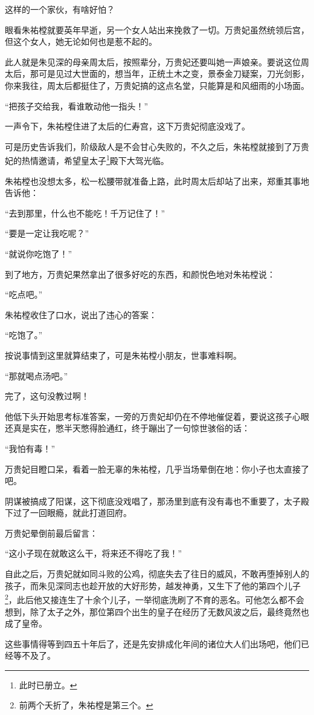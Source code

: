 \begin{multicols}{\theparacolNo}
这样的一个家伙，有啥好怕？

眼看朱祐樘就要英年早逝，另一个女人站出来挽救了一切。万贵妃虽然统领后宫，但这个女人，她无论如何也是惹不起的。

此人就是朱见深的母亲周太后，按照辈分，万贵妃还要叫她一声娘亲。要说这位周太后，那可是见过大世面的，想当年，正统土木之变，景泰金刀疑案，刀光剑影，你来我往，周太后都挺住了，万贵妃搞的这点名堂，只能算是和风细雨的小场面。

“把孩子交给我，看谁敢动他一指头！”

一声令下，朱祐樘住进了太后的仁寿宫，这下万贵妃彻底没戏了。

可是历史告诉我们，阶级敌人是不会甘心失败的，不久之后，朱祐樘就接到了万贵妃的热情邀请，希望皇太子\footnote{此时已册立。}殿下大驾光临。

朱祐樘也没想太多，松一松腰带就准备上路，此时周太后却站了出来，郑重其事地告诉他：

“去到那里，什么也不能吃！千万记住了！”

“要是一定让我吃呢？”

“就说你吃饱了！”

到了地方，万贵妃果然拿出了很多好吃的东西，和颜悦色地对朱祐樘说：

“吃点吧。”

朱祐樘收住了口水，说出了违心的答案：

“吃饱了。”

按说事情到这里就算结束了，可是朱祐樘小朋友，世事难料啊。

“那就喝点汤吧。”

完了，这句没教过啊！

他低下头开始思考标准答案，一旁的万贵妃却仍在不停地催促着，要说这孩子心眼还真是实在，憋半天憋得脸通红，终于蹦出了一句惊世骇俗的话：

“我怕有毒！”

万贵妃目瞪口呆，看着一脸无辜的朱祐樘，几乎当场晕倒在地：你小子也太直接了吧。

阴谋被搞成了阳谋，这下彻底没戏唱了，那汤里到底有没有毒也不重要了，太子殿下过了一回眼瘾，就此打道回府。

万贵妃晕倒前最后留言：

“这小子现在就敢这么干，将来还不得吃了我！”

自此之后，万贵妃就如同斗败的公鸡，彻底失去了往日的威风，不敢再堕掉别人的孩子，而朱见深同志也趁开放的大好形势，越发神勇，又生下了他的第四个儿子\footnote{前两个夭折了，朱祐樘是第三个。}，此后他又接连生了十余个儿子，一举彻底洗刷了不育的恶名。可他怎么都不会想到，除了太子之外，那位第四个出生的皇子在经历了无数风波之后，最终竟然也成了皇帝。

这些事情得等到四五十年后了，还是先安排成化年间的诸位大人们出场吧，他们已经等不及了。
\ifnum{}
	\end{multicols}
\fi
\newpage
